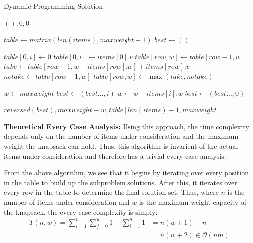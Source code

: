\documentclass{article}
\begin{document}
\FloatBarrier
\begin{algorithm}
\caption{Dynamic Programming Solution}
\begin{algorithmic}[1]
		\Return $(), 0, 0$
	\EndIf

	\State $table \gets matrix(len(items), maxweight + 1)$
	\State $best \gets ()$
	
		\State $table[0, i] \gets 0$
	\EndFor
		\State $table[0, i] \gets items[0].v$
	\EndFor
			\State $table[row, w] \gets table[row-1, w]$
		\EndFor
			\State $take \gets table[row-1, w-items[row].w] + items[row].v$
			\State $notake \gets table[row-1, w]$
			\State $table[row, w] \gets \max(take, notake)$
		\EndFor
	\EndFor

	\State $w \gets maxweight$
			\State $best \gets (best..., i)$
			\State $w \gets w - items[i].w$
		\EndIf
	\EndFor
		\State $best \gets (best..., 0)$
	\EndIf

	\Return $reversed(best), maxweight - w, table[len(items) - 1, maxweight]$
\EndFunction
\end{algorithmic}
\end{algorithm}
\FloatBarrier

\textbf{Theoretical Every Case Analysis:}
Using this approach, the time complexity depends only on the number of items under consideration and the maximum weight the knapsack can hold.
Thus, this algorithm is invarient of the actual items under consideration and therefore has a trivial every case analysis.

From the above algorithm, we see that it begins by iterating over every position in the table to build up the subproblem solutions.
After this, it iterates over every row in the table to determine the final solution set.
Thus, where $n$ is the number of items under consideration and $w$ is the maximum weight capacity of the knapsack, the every case complexity is simply:
\begin{align}
T(n, w) = \sum_{i=1}^n{\sum_{j=0}^w{1}} + \sum_{i=1}^n{1} &= n(w+1) + n \\
&= n(w + 2) \in \mathcal{O}(nm)
\end{align}
\end{document}
